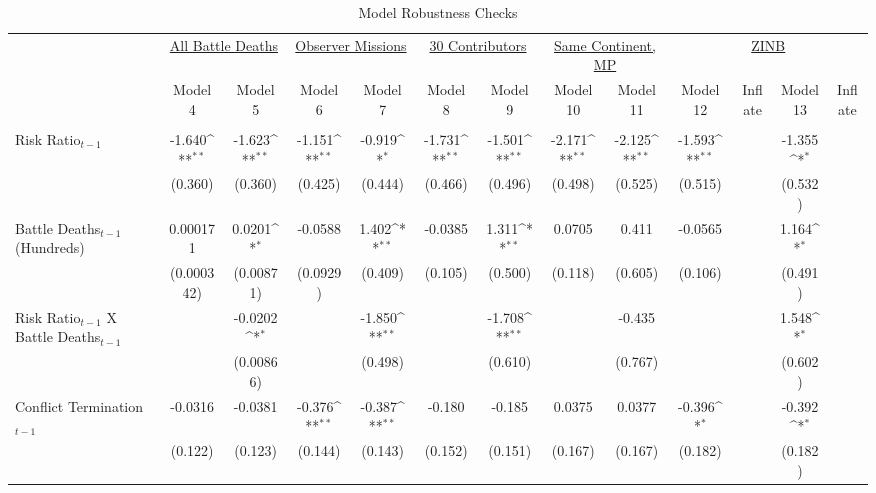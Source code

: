 \begin{table}[htbp]\centering
\fontsize{7.5}{7.5}\selectfont
\def\sym#1{\ifmmode^{#1}\else\(^{#1}\)\fi}
\caption{Model Robustness Checks}
\begin{tabular}{l*{12}{c}}
\hline\hline
                    &\multicolumn{2}{c}{\underline{All Battle Deaths}} & \multicolumn{2}{c}{\underline{Observer Missions}} & \multicolumn{2}{c}{\underline{30 Contributors}} & \multicolumn{2}{c}{\underline{Same Continent, MP}} & \multicolumn{4}{c}{\underline{ZINB}}  \\
                    &\multicolumn{1}{c}{Model 4} &\multicolumn{1}{c}{Model 5} &\multicolumn{1}{c}{Model 6} &\multicolumn{1}{c}{Model 7} &\multicolumn{1}{c}{Model 8} &\multicolumn{1}{c}{Model 9} &\multicolumn{1}{c}{Model 10}        &\multicolumn{1}{c}{Model 11} &\multicolumn{1}{c}{Model 12} &\multicolumn{1}{c}{Inflate} &\multicolumn{1}{c}{Model 13} &\multicolumn{1}{c}{Inflate}       \\
\hline \\
Risk Ratio$_{t-1}$ & -1.640\sym{**} & -1.623\sym{**} & -1.151\sym{**} & -0.919\sym{*} & -1.731\sym{**} & -1.501\sym{**} & -2.171\sym{**} & -2.125\sym{**} & -1.593\sym{**} & &  -1.355\sym{*}  &   \\
                   &     (0.360)    &     (0.360)    &     (0.425)    &     (0.444)   &     (0.466)    &     (0.496)    &     (0.498)    &     (0.525)    &   (0.515)      & &   (0.532)       &  \\
[0.25em]
Battle Deaths$_{t-1}$ (Hundreds)& 0.000171   & 0.0201\sym{*} & -0.0588 & 1.402\sym{**} & -0.0385 & 1.311\sym{**} & 0.0705 & 0.411  & -0.0565 & & 1.164\sym{*} &         \\
                                & (0.000342) &   (0.00871)   & (0.0929)&     (0.409)   &  (0.105)& (0.500)       & (0.118)& (0.605)& (0.106)& & (0.491)      &       \\
[0.25em]
Risk Ratio$_{t-1}$ X Battle Deaths$_{t-1}$ & & -0.0202\sym{*} & & -1.850\sym{**}& & -1.708\sym{**}& & -0.435 & & & 1.548\sym{*}    \\
                                           & & (0.00866)      & & (0.498)       & & (0.610)       & & (0.767)& & & (0.602)      \\
[0.25em]
Conflict Termination$_{t-1}$& -0.0316 & -0.0381 & -0.376\sym{**}& -0.387\sym{**}& -0.180 & -0.185 & 0.0375 & 0.0377 & -0.396\sym{*} & & -0.392\sym{*} & \\
                            & (0.122) & (0.123) & (0.144)       & (0.143)       & (0.152)& (0.151)& (0.167)& (0.167)& (0.182)       & &    (0.182)    & \\

\end{tabular}
\end{table}
